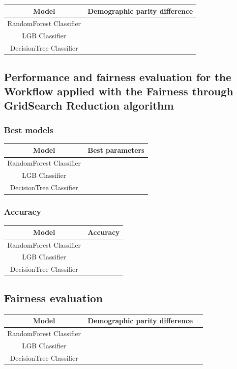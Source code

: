 \documentclass[12pt,a4paper,openright,twoside]{book}
\begin{document}
\begin{tabular}{|c|c|}
    \hline
    \textbf{Model} & \textbf{Demographic parity difference} \\
    \hline
    RandomForest Classifier & & \\
    \hline
    LGB Classifier & & \\
    \hline
    DecisionTree Classifier & & \\
    \hline
\end{tabular}

\subsection{Performance and fairness evaluation for the Workflow applied with the Fairness through GridSearch Reduction algorithm}

\subsubsection{Best models}

\begin{tabular}{|c|c|}
    \hline
    \textbf{Model} & \textbf{Best parameters} \\
    \hline
    RandomForest Classifier  &  \\
    \hline
    LGB Classifier & \\
    \hline
    DecisionTree Classifier & \\
    \hline
\end{tabular}

\subsubsection{Accuracy}

\begin{tabular}{|c|c|}
    \hline
    \textbf{Model} & \textbf{Accuracy} \\ 
    \hline
    RandomForest Classifier  &  \\
    \hline
    LGB Classifier & \\
    \hline
    DecisionTree Classifier & \\ 
    \hline
\end{tabular}

\subsection{Fairness evaluation}

\begin{tabular}{|c|c|c|}
    \hline
    \textbf{Model} & \textbf{Demographic parity difference} \\
    \hline
    RandomForest Classifier & & \\
    \hline
    LGB Classifier & & \\
    \hline
    DecisionTree Classifier & & \\
    \hline
\end{tabular}
\end{document}
